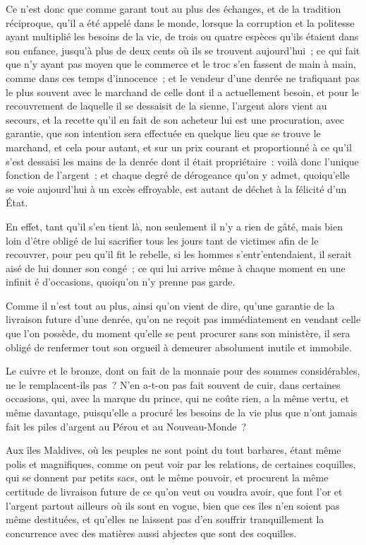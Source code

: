\documentclass[french,twoside]{book} %
\begin{document}
Ce n’est donc que comme garant tout au plus des échanges, et de la tradition réciproque, qu’il a été appelé dans le monde, lorsque la corruption et la politesse ayant multiplié les besoins de la vie, de trois ou quatre espèces qu’ils étaient dans son enfance, jusqu’à plus de deux cents où ils se trouvent aujourd’hui ; ce qui fait que n’y ayant pas moyen que le commerce et le troc s’en fassent de main à main, comme dans ces temps d’innocence ; et le vendeur d’une denrée ne trafiquant pas le plus souvent avec le marchand de celle dont il a actuellement besoin, et pour le recouvrement de laquelle il se dessaisit de la sienne, l’argent alors vient au secours, et la recette qu’il en fait de son acheteur lui est une procuration, avec garantie, que son intention sera effectuée en quelque lieu que se trouve le marchand, et cela pour autant, et sur un prix courant et proportionné à ce qu’il s’est dessaisi les mains de la denrée dont il était propriétaire : voilà donc l’unique fonction de l’argent ; et chaque degré de dérogeance qu’on y admet, quoiqu’elle se voie aujourd’hui à un excès effroyable, est autant de déchet à la félicité d’un État.\par
En effet, tant qu’il s’en tient là, non seulement il n’y a rien de gâté, mais bien loin d’être obligé de lui sacrifier tous les jours tant de victimes afin de le recouvrer, pour peu qu’il fit le rebelle, si les hommes s’entr’entendaient, il serait aisé de lui donner son congé ; ce qui lui arrive même à chaque moment en une infinit
\label{\_GoBack}é d’occasions, quoiqu’on n’y prenne pas garde.\par
Comme il n’est tout au plus, ainsi qu’on vient de dire, qu’une garantie de la livraison future d’une denrée, qu’on ne reçoit pas immédiatement en vendant celle que l’on possède, du moment qu’elle se peut procurer sans son ministère, il sera obligé de renfermer tout son orgueil à demeurer absolument inutile et immobile.\par
Le cuivre et le bronze, dont on fait de la monnaie pour des sommes considérables, ne le remplacent-ils pas ? N’en a-t-on pas fait souvent de cuir, dans certaines occasions, qui, avec la marque du prince, qui ne coûte rien, a la même vertu, et même davantage, puisqu’elle a procuré les besoins de la vie plus que n’ont jamais fait les piles d’argent au Pérou et au Nouveau-Monde ?\par
Aux îles Maldives, où les peuples ne sont point du tout barbares, étant même polis et magnifiques, comme on peut voir par les relations, de certaines coquilles, qui se donnent par petits sacs, ont le même pouvoir, et procurent la même certitude de livraison future de ce qu’on veut ou voudra avoir, que font l’or et l’argent partout ailleurs où ils sont en vogue, bien que ces îles n’en soient pas même destituées, et qu’elles ne laissent pas d’en souffrir tranquillement la concurrence avec des matières aussi abjectes que sont des coquilles.\par
\end{document}
